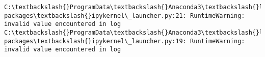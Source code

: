 \documentclass[11pt]{article}
\begin{document}
    \begin{Verbatim}[commandchars=\\\{\}]
C:\textbackslash{}ProgramData\textbackslash{}Anaconda3\textbackslash{}lib\textbackslash{}site-packages\textbackslash{}ipykernel\_launcher.py:21: RuntimeWarning: invalid value encountered in log
C:\textbackslash{}ProgramData\textbackslash{}Anaconda3\textbackslash{}lib\textbackslash{}site-packages\textbackslash{}ipykernel\_launcher.py:19: RuntimeWarning: invalid value encountered in log

    \end{Verbatim}

    \begin{center}
    \end{center}
    { \hspace*{\fill} \\}
    

    
    
    
    
\end{document}
